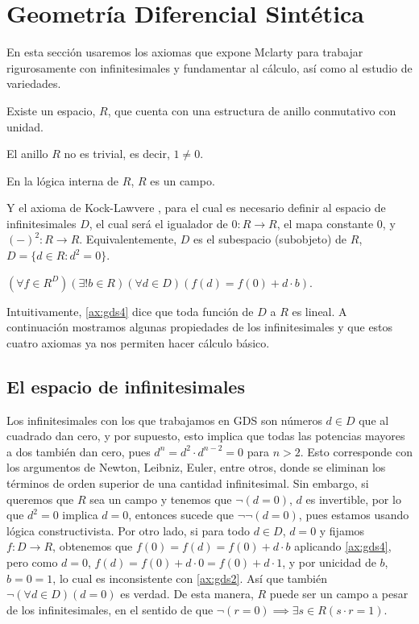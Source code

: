 \chapter{Geometría Diferencial Sintética}
\label{geodif}

En esta sección usaremos los axiomas que expone Mclarty \cite{mclarty1988defining} para trabajar
rigurosamente con infinitesimales y fundamentar al cálculo, así como al estudio de variedades.
\begin{axioma}
Existe un espacio, $R$, que cuenta con una estructura de anillo conmutativo con unidad.
\end{axioma}
\begin{axioma}
El anillo $R$ no es trivial, es decir, $1\not = 0$.
\end{axioma}
\begin{axioma}
En la lógica interna de $R$, $R$ es un campo.
\end{axioma}
Y el axioma de Kock-Lawvere \cite{lawvere1979categorical}, para el cual es necesario definir
al espacio de infinitesimales $D$, el cual será el igualador de $0\colon R\to R$, el mapa constante $0$, y $(-)^2\colon R\to R$.
Equivalentemente, $D$ es el subespacio (subobjeto) de $R$, $D= \{d \in R\colon d^2=0 \}$.
\begin{axioma}
$(\forall f \in R^D)(\exists ! b \in R)(\forall d \in D) (f(d) = f(0)+d \cdot b)$.
\end{axioma}
Intuitivamente, \ref{ax:gds4} dice que toda función de $D$ a $R$ es lineal. A continuación 
mostramos algunas propiedades de los infinitesimales y que estos cuatro axiomas ya nos 
permiten hacer cálculo básico.

\section{El espacio de infinitesimales}
Los infinitesimales con los que trabajamos en GDS son números $d\in D$ que al cuadrado dan cero, y por supuesto,
esto implica que todas las potencias mayores a dos también dan cero, pues $d^n=d^2\cdot d^{n-2}=0$ para $n>2$. Esto
corresponde con los argumentos de Newton, Leibniz, Euler, entre otros, donde se eliminan los términos de orden
superior de una cantidad infinitesimal. Sin embargo, si queremos que $R$ sea un campo y tenemos que $\lnot(d=0)$,
$d$ es invertible, por lo que $d^2=0$ implica $d=0$, entonces sucede que $\lnot\lnot(d=0)$, pues estamos usando
lógica constructivista. Por otro lado, si para todo $d\in D$, $d=0$ y fijamos $f\colon  D \to R$, obtenemos que
$f(0)=f(d)=f(0)+d \cdot b$ aplicando \ref{ax:gds4}, pero como $d=0$, $f(d)=f(0)+d \cdot 0=f(0)+d \cdot 1$, y por unicidad
de $b$, $b=0=1$, lo cual es inconsistente con \ref{ax:gds2}. Así que también $\lnot (\forall d \in D)(d=0)$ es verdad.
De esta manera, $R$ puede ser un campo a pesar de los infinitesimales, en el sentido de que $\lnot(r=0)\implies \exists s\in R(s\cdot r=1)$.

